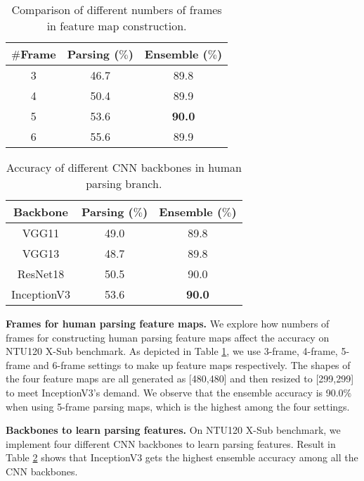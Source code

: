 \documentclass[runningheads]{llncs}
\begin{document}
\begin{table}[t]
\caption{Comparison of different numbers of frames in feature map construction.}
\centering
\begin{tabular}{c|c|c}
\hline
\textbf{$\#$Frame} & \textbf{Parsing} ($\%$) & \textbf{Ensemble} ($\%$) \\\hline
3 & 46.7 & 89.8 \\\hline
4 & 50.4 & 89.9 \\\hline
5 & 53.6 & \textbf{90.0} \\\hline
6 & 55.6 & 89.9 \\\hline
\end{tabular}
\label{tab:frame}
\end{table}


\begin{table}[t]
\caption{Accuracy of different CNN backbones in human parsing branch.}
\centering
\begin{tabular}{c|c|c}
\hline
\textbf{Backbone} & \textbf{Parsing} ($\%$) & \textbf{Ensemble} ($\%$) \\\hline
VGG11 \cite{simonyan2015deep} & 49.0 & 89.8 \\\hline
VGG13 \cite{simonyan2015deep} & 48.7 & 89.8 \\\hline
ResNet18 \cite{he2015deep} & 50.5 & 90.0 \\\hline
InceptionV3 \cite{szegedy2016rethinking} & 53.6 & \textbf{90.0} \\\hline
\end{tabular}
\label{tab:CNN}
\end{table}

\textbf{Frames for human parsing feature maps.} We explore how numbers of frames for constructing human parsing feature maps affect the accuracy on NTU120 X-Sub benchmark. As depicted in Table \ref{tab:frame}, we use 3-frame, 4-frame, 5-frame and 6-frame settings to make up feature maps respectively. The shapes of the four feature maps are all generated as [480,480] and then resized to [299,299] to meet InceptionV3's demand. We observe that the ensemble accuracy is 90.0$\%$ when using 5-frame parsing maps, which is the highest among the four settings.

\textbf{Backbones to learn parsing features.} On NTU120 X-Sub benchmark, we implement four different CNN backbones to learn parsing features. Result in Table \ref{tab:CNN} shows that InceptionV3 gets the highest ensemble accuracy among all the CNN backbones.
\end{document}
